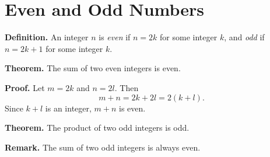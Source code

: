 \documentclass{article}
\begin{document}
\section{Even and Odd Numbers}

\textbf{Definition.} An integer $n$ is \emph{even} if $n = 2k$ for some
integer $k$, and \emph{odd} if $n = 2k + 1$ for some integer $k$.

\textbf{Theorem.} The sum of two even integers is even.

\textbf{Proof.} Let $m = 2k$ and $n = 2l$. Then
\[
  m + n = 2k + 2l = 2(k + l).
\]
Since $k + l$ is an integer, $m + n$ is even.

\textbf{Theorem.} The product of two odd integers is odd.

\textbf{Remark.} The sum of two odd integers is always even.
\end{document}
